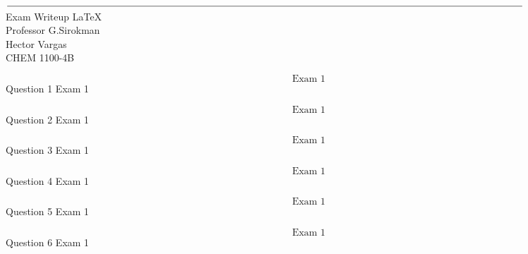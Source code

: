 \documentclass{article}
\begin{document}
    \thispagestyle{empty}
    \begin{center}
        $\line(1,0){525}$\\
        Exam Writeup \LaTeX\\
        Professor G.Sirokman\\
        Hector Vargas\\
        CHEM 1100-4B\\
    \end{center}
    \pagebreak


    $$\text{Exam 1}$$
    Question 1 Exam 1
    \pagebreak

    $$\text{Exam 1}$$
    Question 2 Exam 1
    \pagebreak

    $$\text{Exam 1}$$
    Question 3 Exam 1
    \pagebreak


    $$\text{Exam 1}$$
    Question 4 Exam 1
    \pagebreak


    $$\text{Exam 1}$$
    Question 5 Exam 1
    \pagebreak

    $$\text{Exam 1}$$
    Question 6 Exam 1
    \pagebreak
\end{document}

